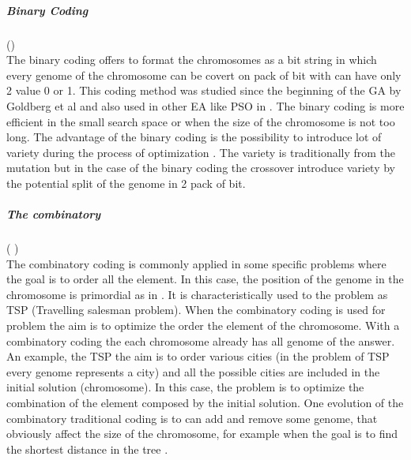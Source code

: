 \subparagraph*{Binary Coding}(\cite{73*wright1991, 95*miller1995,97*goldberg1985,123*owais2008, 131*walters1995})  
\\The binary coding offers to format the chromosomes as a bit string in which every genome of the chromosome can be covert on pack of bit with can have only 2 value 0 or 1. This coding method was studied since the beginning of the GA by Goldberg et al  \cite{97*goldberg1985} and also used in other EA like PSO in \cite{87*morsly2012}. The binary coding is more efficient in the small search space or when the size of the chromosome is not too long. The advantage of the binary coding is the possibility to introduce lot of variety during the process of optimization \cite{73*wright1991}. The variety is traditionally from the mutation but in the case of the binary coding the crossover introduce variety by the potential split of the genome in 2 pack of bit.
\\
\subparagraph*{The combinatory }(\cite{ 80*serpell2010,110*eiben2003} )
\\The combinatory coding is commonly applied in some specific problems where the goal is to order all the element. In this case, the position of the genome in the chromosome is primordial as in \cite{ 110*eiben2003}. It is characteristically used to the problem as TSP \cite{80*serpell2010} (Travelling salesman problem).  When the combinatory coding is used for problem the aim is to optimize the order the element of the chromosome. With a combinatory coding the each chromosome already has all genome of the answer. An example, the TSP the aim is to order various cities (in the problem of TSP every genome represents a city) and all the possible cities are included in the initial solution (chromosome). In this case, the problem is to optimize the combination of the element composed by the initial solution. 
One evolution of the combinatory traditional coding is to can add and remove some genome, that obviously affect the size of the chromosome, for example  when the goal is to find the shortest distance in the tree \cite{113*mais2010}. \\

